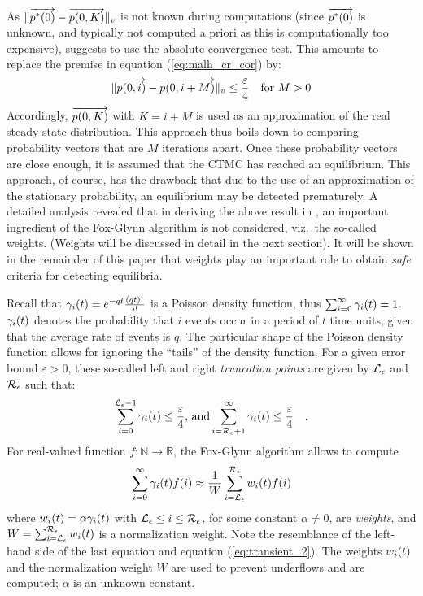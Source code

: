 \documentclass[times, 10pt,twocolumn]{article}
\begin{document}
		As $\lVert \overrightarrow{p^{*}(0)} - \overrightarrow{p(0,K)} \rVert_{v}$ is not known during computations (since $\overrightarrow{p^{*}(0)}$ is unknown, and typically not computed a priori as this is computationally too expensive), \cite{MalhotraMT_MR94} suggests to use the absolute convergence test.  This amounts to replace the premise in equation (\ref{eq:malh_cr_cor}) by:
		{\small
		\[
			\lVert \overrightarrow{p(0,i)} - \overrightarrow{p(0,i+M)} \rVert_{v} \leq \frac{\varepsilon}{4} \quad \mbox{for } M > 0
		\]
		}
		Accordingly, $\overrightarrow{p(0,K)}$ with $K = i{+}M$ is used as an approximation of the real steady-state distribution.  This approach thus boils down to comparing probability vectors that are $M$ iterations apart.  Once these probability vectors are close enough, it is assumed that the CTMC has reached an equilibrium.  This approach, of course, has the drawback that due to the use of an approximation of the stationary probability, an equilibrium may be detected prematurely.  A detailed analysis revealed that in deriving the above result in \cite{MalhotraMT_MR94},  an important ingredient of the Fox-Glynn algorithm is not considered, viz.\ the so-called weights.  (Weights will be discussed in detail in the next section).   It will be shown in the remainder of this paper that weights play an important role to obtain \emph{safe} criteria for detecting equilibria.

	
	Recall that  $\gamma_{i}(t) = e^{-q t}\frac{\left( q t \right)^{i}}{i!}$ is a Poisson density function, thus $\sum_{i=0}^{\infty}\gamma_{i}(t) = 1$.  $\gamma_{i}(t)$ denotes the probability that $i$ events occur in a period of $t$ time units, given that the average rate of events is $q$.  The particular shape of the Poisson density function allows for ignoring the ``tails'' of the density function.  For a given error bound $\varepsilon > 0$, these so-called left and right \emph{truncation points} are given by $\mathcal{L}_{\epsilon}$ and $\mathcal{R}_{\epsilon}$ such that:
	\[
		\sum_{i=0}^{\mathcal{L}_{\epsilon}{-}1}\gamma_{i}(t) \leq \frac{\varepsilon}{4} \text{, and} \sum_{i=\mathcal{R}_{\epsilon}{+}1}^{\infty}\gamma_{i}(t) \leq \frac{\varepsilon}{4} \quad .
	\]
	For real-valued function $f : \mathbb{N} \to \mathbb{R}$, the Fox-Glynn algorithm \cite{FoxG_ACM88} allows to compute
	\[
	 	\sum_{i=0}^{\infty} \gamma_{i}(t) f(i) \approx \frac{1}{W}\sum_{i = \mathcal{L}_{\epsilon}}^{\mathcal{R}_{\epsilon}} w_{i}(t) f(i)
	\]
	 where $w_{i}(t) = \alpha \gamma_{i}(t)$ with $\mathcal{L}_{\epsilon} \leq i \leq \mathcal{R}_{\epsilon}$, for some constant $\alpha \neq 0$, are \emph{weights}, and $W = \sum_{i=\mathcal{L}_{\epsilon}}^{\mathcal{R}_{\epsilon}} w_{i}(t)$ is a normalization weight.  Note the resemblance of the left-hand side of the last equation and equation (\ref{eq:transient_2}).  The weights $w_{i}(t)$ and the normalization weight $W$ are used to prevent underflows and are computed; $\alpha$ is an unknown constant.
	
\end{document}
